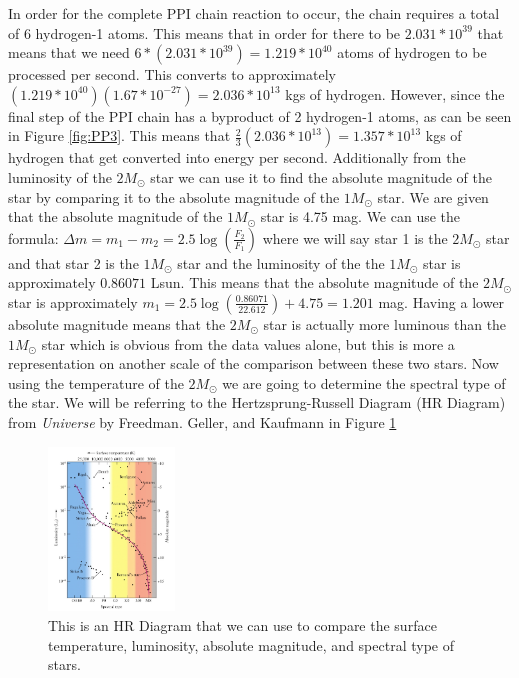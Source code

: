 \documentclass{article}
\begin{document}
\begin{multicols}{2}

In order for the complete PPI chain reaction to occur, the chain requires a total of 6 hydrogen-1 atoms. This means that in order for there to be $2.031*10^{39}$ that means that we need $6*(2.031*10^{39}) = 1.219*10^{40}$ atoms of hydrogen to be processed per second. This converts to approximately $(1.219*10^{40})(1.67*10^{-27}) = 2.036*10^{13}$ kgs of hydrogen. However, since the final step of the PPI chain has a byproduct of 2 hydrogen-1 atoms, as can be seen in Figure \ref{fig:PP3}. This means that $\frac{2}{3}(2.036*10^{13}) = 1.357*10^{13}$ kgs of hydrogen that get converted into energy per second. Additionally from the luminosity of the $2M_\odot$ star we can use it to find the absolute magnitude of the star by comparing it to the absolute magnitude of the $1M_\odot$ star. We are given that the absolute magnitude of the $1M_\odot$ star is 4.75 mag. We can use the formula: $\Delta m = m_1-m_2 = 2.5\log(\frac{F_2}{F_1})$ where we will say star 1 is the $2M_\odot$ star and that star 2 is the $1M_\odot$ star and the luminosity of the the $1M_\odot$ star is approximately $0.86071$ Lsun. This means that the absolute magnitude of the $2M_\odot$ star is approximately $m_1 = 2.5\log(\frac{0.86071}{22.612})+4.75 = 1.201$ mag. Having a lower absolute magnitude means that the $2M_\odot$ star is actually more luminous than the $1M_\odot$ star which is obvious from the data values alone, but this is more a representation on another scale of the comparison between these two stars. Now using the temperature of the $2M_\odot$ we are going to determine the spectral type of the star. We will be referring to the Hertzsprung-Russell Diagram (HR Diagram) from \textit{Universe} by Freedman. Geller, and Kaufmann in Figure \ref{fig:hrd1}

\end{multicols}

\begin{figure}
  \centering
  \includegraphics[width=0.3\textwidth]{HRD1.png}
  \caption{This is an HR Diagram that we can use to compare the surface temperature, luminosity, absolute magnitude, and spectral type of stars.}
  \label{fig:hrd1}
\end{figure}
\end{document}
